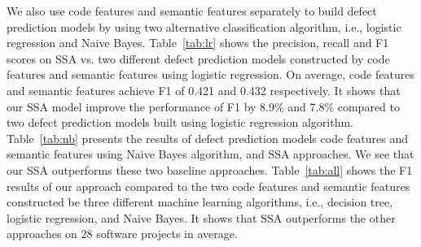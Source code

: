 We also use code features and semantic features separately to build defect prediction models by using two alternative classification algorithm, i.e., logistic regression and Naive Bayes. Table~\ref{tab:lr} shows the precision, recall and F1 scores on SSA vs. two different defect prediction models constructed by code features and semantic features using logistic regression. On average, code features and semantic features achieve F1 of 0.421 and 0.432 respectively. It shows that our SSA model improve the performance of F1 by 8.9\% and 7.8\% compared to two defect prediction models built using logistic regression algorithm. Table~\ref{tab:nb} presents the results of defect prediction models code features and semantic features using Naive Bayes algorithm, and SSA approaches. We see that our SSA outperforms these two baseline approaches. Table~\ref{tab:all} shows the F1 results of our approach compared to the two code features and semantic features constructed be three different machine learning algorithms, i.e., decision tree, logistic regression, and Naive Bayes. It shows that SSA outperforms the other approaches on 28 software projects in average. 



